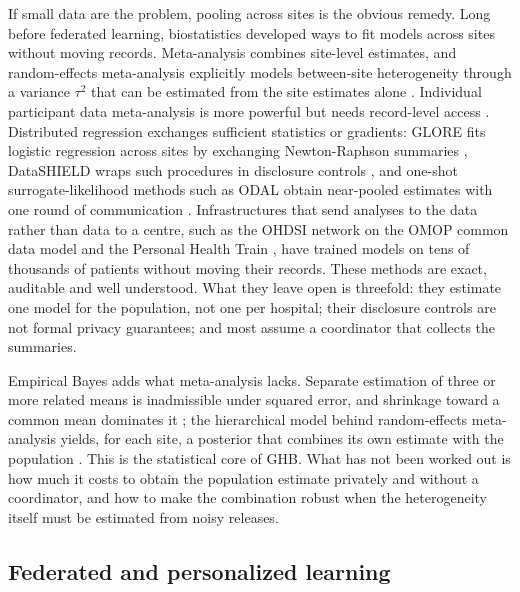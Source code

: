 \documentclass[acmsmall,screen,review]{acmart}
\theoremstyle{acmdefinition}
\begin{document}
If small data are the problem, pooling across sites is the obvious remedy. Long before federated learning, biostatistics developed ways to fit models across sites without moving records. Meta-analysis combines site-level estimates, and random-effects meta-analysis explicitly models between-site heterogeneity through a variance $\tau^2$ that can be estimated from the site estimates alone \cite{dersimonian1986meta}. Individual participant data meta-analysis is more powerful but needs record-level access \cite{riley2010meta}. Distributed regression exchanges sufficient statistics or gradients: GLORE fits logistic regression across sites by exchanging Newton-Raphson summaries \cite{wu2012grid}, DataSHIELD wraps such procedures in disclosure controls \cite{gaye2014datashield}, and one-shot surrogate-likelihood methods such as ODAL obtain near-pooled estimates with one round of communication \cite{duan2020learning,jordan2019communication}. Infrastructures that send analyses to the data rather than data to a centre, such as the OHDSI network on the OMOP common data model \cite{hripcsak2015observational} and the Personal Health Train \cite{beyan2020distributed,deist2020distributed}, have trained models on tens of thousands of patients without moving their records. These methods are exact, auditable and well understood. What they leave open is threefold: they estimate one model for the population, not one per hospital; their disclosure controls are not formal privacy guarantees; and most assume a coordinator that collects the summaries.

Empirical Bayes adds what meta-analysis lacks. Separate estimation of three or more related means is inadmissible under squared error, and shrinkage toward a common mean dominates it \cite{efron1973steins,stein1956inadmissibility}; the hierarchical model behind random-effects meta-analysis yields, for each site, a posterior that combines its own estimate with the population \cite{gelman2013bayesian}. This is the statistical core of GHB. What has not been worked out is how much it costs to obtain the population estimate privately and without a coordinator, and how to make the combination robust when the heterogeneity itself must be estimated from noisy releases.

\subsection{Federated and personalized learning}\label{sec:federated}
\end{document}
